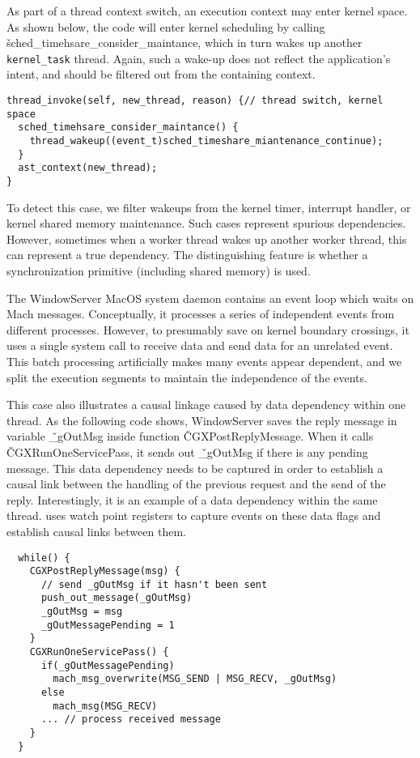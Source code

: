 As part of a thread context switch, an execution context may enter kernel
space. As shown below, the code will enter kernel scheduling by calling
\v{sched\_timehsare\_consider\_maintance}, which in turn wakes up another
\texttt{kernel\_task} thread.  Again, such a wake-up does not reflect the application's intent, and should be filtered out from the containing context.  

{\footnotesize \begin{verbatim}
thread_invoke(self, new_thread, reason) {// thread switch, kernel space
  sched_timehsare_consider_maintance() {
    thread_wakeup((event_t)sched_timeshare_miantenance_continue);
  }
  ast_context(new_thread);
}
\end{verbatim}
}

To detect this case, we filter wakeups from the kernel timer, interrupt
handler, or kernel shared memory maintenance. Such cases represent spurious
dependencies. However, sometimes when a worker thread wakes up another worker
thread, this can represent a true dependency. The distinguishing feature is
whether a synchronization primitive (including shared memory) is used.

The WindowServer MacOS system daemon contains an event loop which waits on Mach
messages. Conceptually, it processes a series of independent events from
different processes. However, to presumably save on kernel boundary crossings, it uses a
single system call to receive data and send data for an unrelated
event. This batch processing artificially makes many events appear dependent, and we split
the execution segments to maintain the independence of the events.

This case also illustrates a causal linkage caused by data dependency
within one thread.  As the following code shows, WindowServer saves the
reply message in variable \v{\_gOutMsg} inside function
\v{CGXPostReplyMessage}.  When it calls \v{CGXRunOneServicePass}, it sends
out \v{\_gOutMsg} if there is any pending message.  This data dependency
needs to be captured in order to establish a causal link between the
handling of the previous request and the send of the reply.
Interestingly, it is an example of a data dependency within the same
thread.  \xxx uses watch point registers to capture events on these data
flags and establish causal links between them.

{\footnotesize \begin{verbatim}
  while() {
    CGXPostReplyMessage(msg) {
      // send _gOutMsg if it hasn't been sent
      push_out_message(_gOutMsg)
      _gOutMsg = msg
      _gOutMessagePending = 1
    }
    CGXRunOneServicePass() {
      if(_gOutMessagePending)
        mach_msg_overwrite(MSG_SEND | MSG_RECV, _gOutMsg)
      else
        mach_msg(MSG_RECV)
      ... // process received message
    }
  }
\end{verbatim}
}

